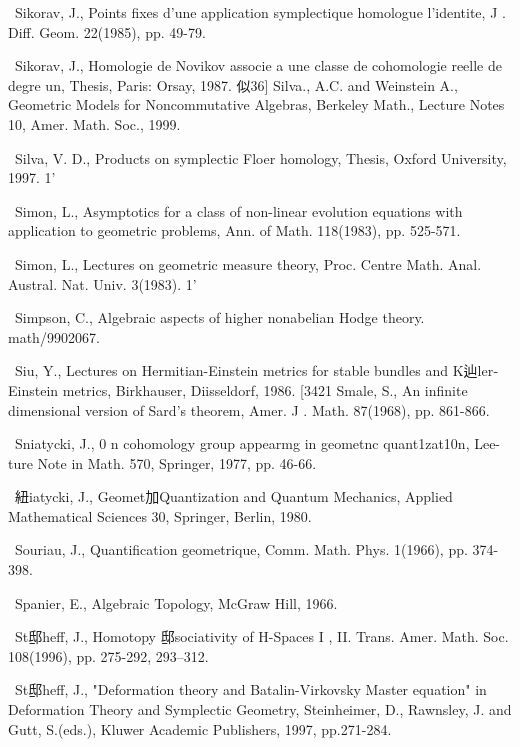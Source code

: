{\noindent [334]\ Sikorav, J., Points fixes d'une application symplectique homologue l'identite, J . Diff. Geom. 22(1985), pp. 49-79.\par\smallskip
\noindent [335]\ Sikorav, J., Homologie de Novikov associe a une classe de cohomologie reelle de degre un, Thesis, Paris: Orsay, 1987. 似36] Silva., A.C. and Weinstein A., Geometric Models for Noncommutative Algebras, Berkeley Math., Lecture Notes 10, Amer. Math. Soc., 1999.\par\smallskip
\noindent [337]\ Silva, V. D., Products on symplectic Floer homology, Thesis, Oxford University, 1997. 1'\par\smallskip
\noindent [338]\ Simon, L., Asymptotics for a class of non-linear evolution equations with application to geometric problems, Ann. of Math. 118(1983), pp. 525-571.\par\smallskip
\noindent [339]\ Simon, L., Lectures on geometric measure theory, Proc. Centre Math. Anal. Austral. Nat. Univ. 3(1983). 1'\par\smallskip
\noindent [340]\ Simpson, C., Algebraic aspects of higher nonabelian Hodge theory. math/9902067.\par\smallskip
\noindent [341]\ Siu, Y., Lectures on Hermitian-Einstein metrics for stable bundles and K辿ler­ Einstein metrics, Birkhauser, Diisseldorf, 1986. [3421 Smale, S., An infinite dimensional version of Sard's theorem, Amer. J . Math. 87(1968), pp. 861-866.\par\smallskip
\noindent [343]\ Sniatycki, J., 0 n cohomology group appearmg in geometnc quant1zat10n, Lee-ture Note in Math. 570, Springer, 1977, pp. 46-66.\par\smallskip
\noindent [344]\ 紐iatycki, J., Geomet加Quantization and Quantum Mechanics, Applied Mathematical Sciences 30, Springer, Berlin, 1980.\par\smallskip
\noindent [345]\ Souriau, J., Quantification geometrique, Comm. Math. Phys. 1(1966), pp. 374-398.\par\smallskip
\noindent [346]\ Spanier, E., Algebraic Topology, McGraw Hill, 1966.\par\smallskip
\noindent [347]\ St邸heff, J., Homotopy 邸sociativity of H-Spaces I , II. Trans. Amer. Math. Soc. 108(1996), pp. 275-292, 293--312.\par\smallskip
\noindent [348]\ St邸heff, J., "Deformation theory and Batalin-Virkovsky Master equation" in Deformation Theory and Symplectic Geometry, Steinheimer, D., Rawnsley, J. and Gutt, S.(eds.), Kluwer Academic Publishers, 1997, pp.271-284.\par\smallskip
}
